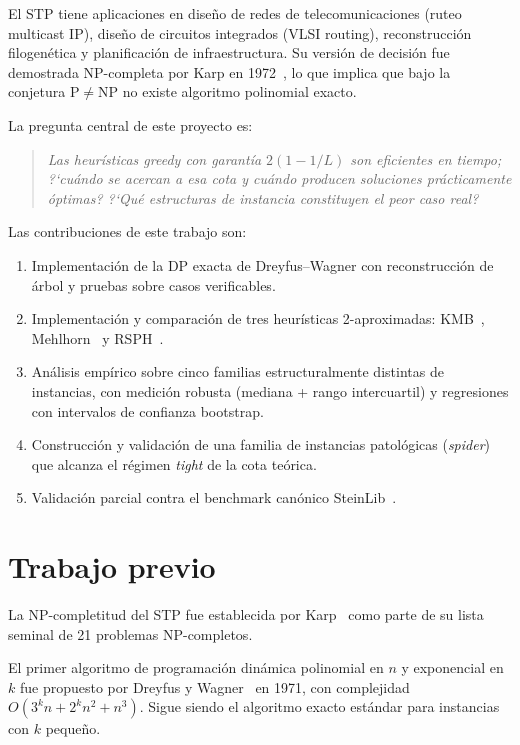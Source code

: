 \documentclass[11pt]{article}
\begin{document}
El STP tiene aplicaciones en dise\~no de redes de telecomunicaciones
(ruteo multicast IP), dise\~no de circuitos integrados (VLSI routing),
reconstrucci\'on filogen\'etica y planificaci\'on de infraestructura.
Su versi\'on de decisi\'on fue demostrada NP-completa por Karp en
1972~\cite{Karp1972}, lo que implica que bajo la conjetura $\mathrm{P}\ne\mathrm{NP}$
no existe algoritmo polinomial exacto.

La pregunta central de este proyecto es:
\begin{quote}
\emph{Las heur\'isticas greedy con garant\'ia $2(1-1/L)$ son eficientes en
tiempo; ?`cu\'ando se acercan a esa cota y cu\'ando producen soluciones
pr\'acticamente \'optimas?  ?`Qu\'e estructuras de instancia constituyen
el peor caso real?}
\end{quote}

Las contribuciones de este trabajo son:
\begin{enumerate}
  \item Implementaci\'on de la DP exacta de Dreyfus--Wagner con
        reconstrucci\'on de \'arbol y pruebas sobre casos verificables.
  \item Implementaci\'on y comparaci\'on de tres heur\'isticas
        2-aproximadas: KMB~\cite{KouMarkowskyBerman1981},
        Mehlhorn~\cite{Mehlhorn1988} y RSPH~\cite{TakahashiMatsuyama1980}.
  \item An\'alisis emp\'irico sobre cinco familias estructuralmente distintas
        de instancias, con medici\'on robusta (mediana + rango intercuartil)
        y regresiones con intervalos de confianza bootstrap.
  \item Construcci\'on y validaci\'on de una familia de instancias
        patol\'ogicas (\emph{spider}) que alcanza el r\'egimen \emph{tight}
        de la cota te\'orica.
  \item Validaci\'on parcial contra el benchmark can\'onico
        SteinLib~\cite{KochMartinVoss2001}.
\end{enumerate}

\section{Trabajo previo}\label{sec:related}

La NP-completitud del STP fue establecida por Karp~\cite{Karp1972} como
parte de su lista seminal de 21 problemas NP-completos.

El primer algoritmo de programaci\'on din\'amica polinomial en $n$ y
exponencial en $k$ fue propuesto por Dreyfus y Wagner~\cite{DreyfusWagner1971}
en 1971, con complejidad $O(3^k n + 2^k n^2 + n^3)$.  Sigue siendo el
algoritmo exacto est\'andar para instancias con $k$ peque\~no.
\end{document}
